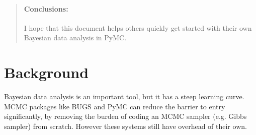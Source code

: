 \documentclass[10pt]{bmc_article}
\newenvironment{bmcformat}{\begin{raggedright}\baselineskip20pt\sloppy\setboolean{publ}{false}}{\end{raggedright}\baselineskip20pt\sloppy}
\begin{document}
\begin{bmcformat}
\begin{abstract}
        \paragraph*{Conclusions:} I hope that this document helps others quickly get started with their own Bayesian data analysis in PyMC.
\end{abstract}












\section*{Background}
Bayesian data analysis is an important tool, but it has a steep
learning curve.  MCMC packages like BUGS and PyMC can reduce the
barrier to entry significantly, by removing the burden of coding an
MCMC sampler (e.g. Gibbs sampler) from scratch.  However these systems
still have overhead of their own.


\end{bmcformat}
\end{document}
